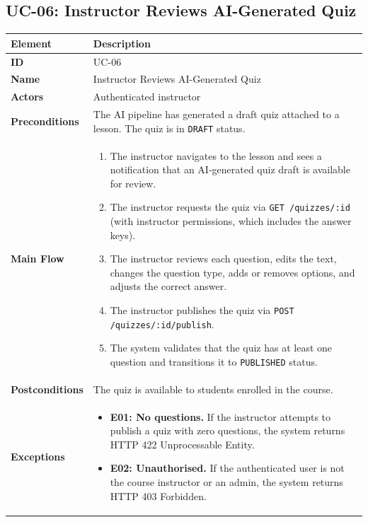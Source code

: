 \subsection{UC-06: Instructor Reviews AI-Generated Quiz}

\begin{longtable}{p{3cm}p{10cm}}
  \toprule
  \textbf{Element} & \textbf{Description} \\
  \midrule
  \endhead
  \midrule
  \endfoot
  \textbf{ID} & UC-06 \\
  \textbf{Name} & Instructor Reviews AI-Generated Quiz \\
  \textbf{Actors} & Authenticated instructor \\
  \textbf{Preconditions} & The AI pipeline has generated a draft quiz attached to a lesson. The quiz is in \texttt{DRAFT} status. \\
  \textbf{Main Flow} &
  \begin{enumerate}
    \item The instructor navigates to the lesson and sees a notification that an AI-generated quiz draft is available for review.
    \item The instructor requests the quiz via \texttt{GET /quizzes/:id} (with instructor permissions, which includes the answer keys).
    \item The instructor reviews each question, edits the text, changes the question type, adds or removes options, and adjusts the correct answer.
    \item The instructor publishes the quiz via \texttt{POST /quizzes/:id/publish}.
    \item The system validates that the quiz has at least one question and transitions it to \texttt{PUBLISHED} status.
  \end{enumerate} \\
  \textbf{Postconditions} & The quiz is available to students enrolled in the course. \\
  \textbf{Exceptions} &
  \begin{itemize}
    \item \textbf{E01: No questions.} If the instructor attempts to publish a quiz with zero questions, the system returns HTTP 422 Unprocessable Entity.
    \item \textbf{E02: Unauthorised.} If the authenticated user is not the course instructor or an admin, the system returns HTTP 403 Forbidden.
  \end{itemize} \\
  \bottomrule
\end{longtable}

